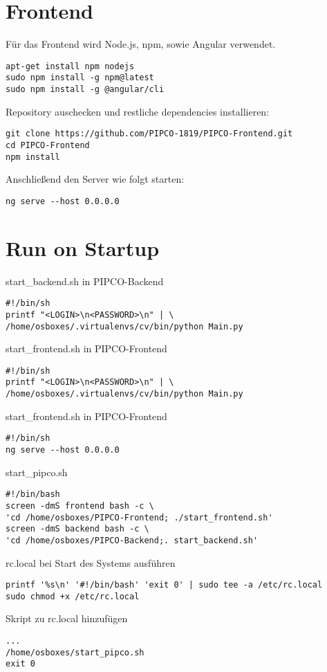 \section{Frontend}
Für das Frontend wird Node.js, npm, sowie Angular verwendet.
\begin{lstlisting}[frame=single]
apt-get install npm nodejs
sudo npm install -g npm@latest
sudo npm install -g @angular/cli
\end{lstlisting}
Repository auschecken und restliche dependencies installieren:
\begin{lstlisting}[frame=single]
git clone https://github.com/PIPCO-1819/PIPCO-Frontend.git
cd PIPCO-Frontend
npm install
\end{lstlisting}
Anschließend den Server wie folgt starten:
\begin{lstlisting}[frame=single]
ng serve --host 0.0.0.0
\end{lstlisting}

\section{Run on Startup}
start\_backend.sh in PIPCO-Backend
\begin{lstlisting}[frame=single]
#!/bin/sh
printf "<LOGIN>\n<PASSWORD>\n" | \
/home/osboxes/.virtualenvs/cv/bin/python Main.py
\end{lstlisting}

start\_frontend.sh in PIPCO-Frontend
\begin{lstlisting}[frame=single]
#!/bin/sh
printf "<LOGIN>\n<PASSWORD>\n" | \
/home/osboxes/.virtualenvs/cv/bin/python Main.py
\end{lstlisting}

start\_frontend.sh in PIPCO-Frontend
\begin{lstlisting}[frame=single]
#!/bin/sh
ng serve --host 0.0.0.0
\end{lstlisting}

start\_pipco.sh
\begin{lstlisting}[frame=single]
#!/bin/bash
screen -dmS frontend bash -c \
'cd /home/osboxes/PIPCO-Frontend; ./start_frontend.sh'
screen -dmS backend bash -c \
'cd /home/osboxes/PIPCO-Backend;. start_backend.sh'
\end{lstlisting}

rc.local bei Start des Systems ausführen
\begin{lstlisting}[frame=single]
printf '%s\n' '#!/bin/bash' 'exit 0' | sudo tee -a /etc/rc.local
sudo chmod +x /etc/rc.local
\end{lstlisting}
Skript zu rc.local hinzufügen
\begin{lstlisting}[frame=single]
...
/home/osboxes/start_pipco.sh
exit 0
\end{lstlisting}